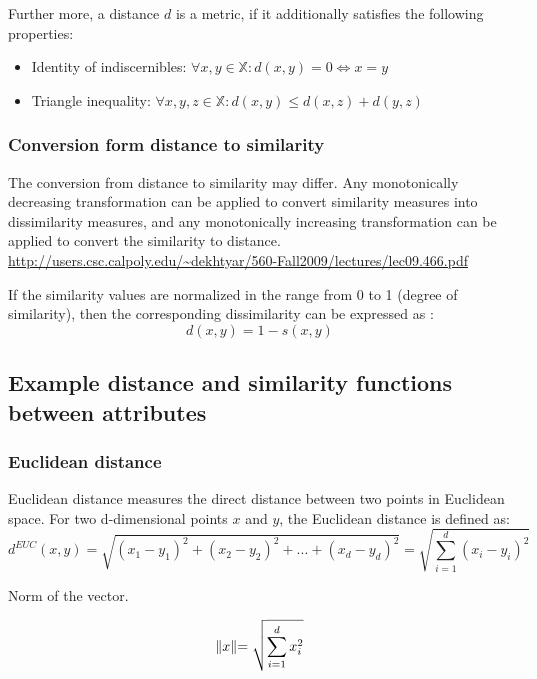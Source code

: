 Further more, a distance $d$ is a metric, if it additionally satisfies the following properties:
\begin{itemize}
	\item Identity of indiscernibles: $\forall x,y \in \mathds{X}: d(x,y) = 0 \Leftrightarrow x=y$
	\item Triangle inequality: $\forall x,y,z \in \mathds{X}: d(x,y) \leqslant d(x,z) + d(y,z)$
\end{itemize}

\subsubsection{Conversion form distance to similarity}

The conversion from distance to similarity may differ. 
Any monotonically decreasing transformation can be applied to convert similarity measures into dissimilarity measures, 
and any monotonically increasing transformation can be applied to convert the similarity to distance.
\url{http://users.csc.calpoly.edu/~dekhtyar/560-Fall2009/lectures/lec09.466.pdf}

If the similarity values are normalized in the range from 0 to 1 (degree of similarity), then the corresponding dissimilarity can be expressed as : 
\begin{equation}
d(x,y) = 1 - s(x,y)
\label{disi}
\end{equation}

\subsection{Example distance and similarity functions  between attributes}
\subsubsection{Euclidean distance}

Euclidean distance measures the direct distance between two points in Euclidean space. For two d-dimensional points $x$ and $y$, the Euclidean distance is defined as:
\begin{equation}
	d^{EUC}(x,y) = \sqrt{(x_{1} - y_{1})^{2} + (x_{2} - y_{2})^{2} + ... + (x_{d} - y_{d})^{2} } = \sqrt{\sum_{i=1}^{d} (x_{i}-y_{i})^{2}}
\end{equation}

Norm of the vector.

\begin{equation}
	\lVert x\lVert = \sqrt{\sum_{i=1}^{d}x_{i}^{2}}
	\title{eq:norm}
\end{equation}

